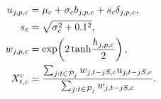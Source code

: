 \begin{equation}
 \begin{split}
 u_{j,p,c}&=\mu_c+\sigma_c b_{j,p,c}+s_c\delta_{j,p,c},\\
 s_c&=\sqrt{\sigma_c^2+0.1^2},\\
 w_{j,p,c}&=\exp\!\left(2\tanh\!\frac{h_{j,p,c}}2\right),\\
 X^{\rm c}_{t,c}&=\frac{\sum_{j:t\in\mathcal P_j}w_{j,t-jS,c}u_{j,t-jS,c}}
 {\sum_{j:t\in\mathcal P_j}w_{j,t-jS,c}}.
 \end{split}\label{eq:overlap}
\end{equation}
